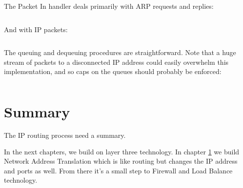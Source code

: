\inputminted[firstline=94,lastline=110]{python}{code/routing/router_handler.py} 

The Packet In handler deals primarily with ARP requests and replies:

\inputminted[firstline=111,lastline=147]{python}{code/routing/router_handler.py} 

And with IP packets:

\inputminted[firstline=149]{python}{code/routing/router_handler.py} 

The queuing and dequeuing procedures are straightforward.  Note that a huge stream of packets to a 
disconnected IP address could easily overwhelm this implementation, and so caps on the queues should
probably be enforced:

\inputminted[firstline=54,lastline=92]{python}{code/routing/router_handler.py} 

\section{Summary}

The IP routing process need a summary.  

In the next chapters, we build on layer three technology.  In chapter \ref{} we build Network Address Translation
which is like routing but changes the IP address and ports as well.  From there it's a small step to 
Firewall and Load Balance technology.  
